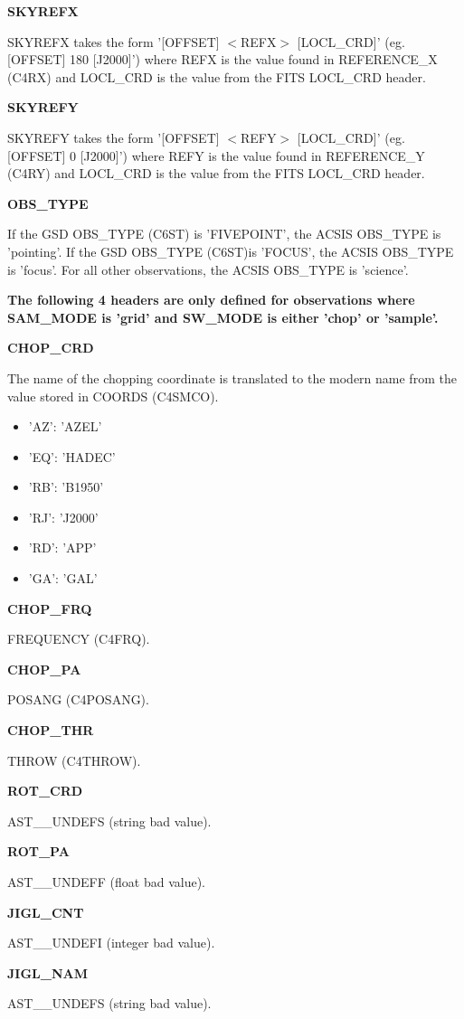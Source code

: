 \documentclass[twoside,11pt,nolof]{starlink}
\providecommand{\referenceX}{REFERENCE\_X (C4RX)}
\providecommand{\referenceY}{REFERENCE\_Y (C4RY)}
\providecommand{\obsType}{OBS\_TYPE (C6ST)}
\providecommand{\chopFrequency}{FREQUENCY (C4FRQ)}
\providecommand{\chopCoords}{COORDS (C4SMCO)}
\providecommand{\chopThrow}{THROW (C4THROW)}
\providecommand{\chopPA}{POSANG (C4POSANG)}
\begin{document}
\textbf{SKYREFX}

SKYREFX takes the form '[OFFSET] $<$REFX$>$ [LOCL\_CRD]' (eg. [OFFSET] 180 [J2000]') where REFX is the value found in \referenceX{} and LOCL\_CRD is the value from the FITS LOCL\_CRD header.

\textbf{SKYREFY}

SKYREFY takes the form '[OFFSET] $<$REFY$>$ [LOCL\_CRD]' (eg. [OFFSET] 0 [J2000]') where REFY is the value found in \referenceY{} and LOCL\_CRD is the value from the FITS LOCL\_CRD header.

\textbf{OBS\_TYPE}

If the GSD \obsType{} is 'FIVEPOINT', the ACSIS OBS\_TYPE is 'pointing'.  If the GSD \obsType is 'FOCUS', the ACSIS OBS\_TYPE is 'focus'.  For all other observations, the ACSIS OBS\_TYPE is 'science'.

\textbf{The following 4 headers are only defined for observations where SAM\_MODE is 'grid' and SW\_MODE is either 'chop' or 'sample'. }

\textbf{CHOP\_CRD}

The name of the chopping coordinate is translated to the modern name from the value stored in \chopCoords.

\begin{itemize}
\item 'AZ': 'AZEL'
\item 'EQ': 'HADEC'
\item 'RB': 'B1950'
\item 'RJ': 'J2000'
\item 'RD': 'APP'
\item 'GA': 'GAL'
\end{itemize}

\textbf{CHOP\_FRQ}

\chopFrequency.

\textbf{CHOP\_PA}

\chopPA.

\textbf{CHOP\_THR}

\chopThrow.

\textbf{ROT\_CRD}

AST\_\_UNDEFS (string bad value).

\textbf{ROT\_PA}

AST\_\_UNDEFF (float bad value).

\textbf{JIGL\_CNT}

AST\_\_UNDEFI (integer bad value).

\textbf{JIGL\_NAM}

AST\_\_UNDEFS (string bad value).
\end{document}
